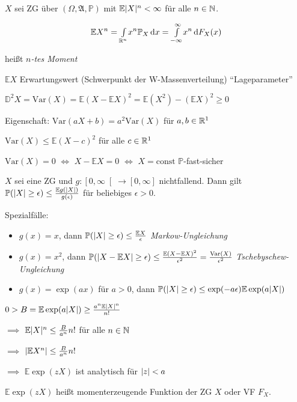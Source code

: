 \documentclass{cheat-sheet}
\newcommand{\Alg}{\mathfrak{A}} %
\renewcommand{\P}{\mathbb{P}} %
\newcommand{\E}{\mathbb{E}} %
\newcommand{\Var}{\mathrm{Var}} %
\begin{document}


$X$ sei ZG über $(\Omega, \Alg, \P)$ mit $\E \abs{X}^n < \infty$ für alle $n \in \mathbb{N}$.

\[ \E X^n = \Int{\R^n}{}{x^n \P_X}{x} = \Int{-\infty}{\infty}{x^n}{F_X(x)} \]

heißt \emph{$n$-tes Moment}

$\E X$ Erwartungswert (Schwerpunkt der W-Massenverteilung) "`Lageparameter"'

$\mathbb{D}^2 X = \Var(X) = \E(X-\E X)^2 = \E(X^2) - (\E X)^2 \geq 0$

Eigenschaft: $\Var(aX+b) = a^2 \Var(X)$ für $a, b \in \mathbb{R}^1$

$\Var(X) \leq \E (X-c)^2$ für alle $c \in \mathbb{R}^1$

$\Var(X) = 0$ $\iff$ $X - \E X = 0$ $\iff$ $X = \mathrm{const}$ $\P$-fast-sicher

\begin{satz}
  $X$ sei eine ZG und $g : \left[ 0, \infty \right[ \to [0,\infty]$ nichtfallend. Dann gilt $\P(\abs{X} \geq \epsilon) \leq \frac{\E g(\abs{X})}{g(\epsilon)}$ für beliebiges $\epsilon > 0$.
\end{satz}

Spezialfälle:

\begin{itemize}
  \item $g(x) = x$, dann $\P(\abs{X} \geq \epsilon) \leq \frac{\E X}{\epsilon}$ \emph{Markow-Ungleichung}
  \item $g(x) = x^2$, dann $\P(\abs{X - \E X} \geq \epsilon) \leq \frac{\E (X - \E X)^2}{\epsilon^2} = \frac{\Var(X)}{\epsilon^2}$ \emph{Tschebyschew-Ungleichung}
  \item $g(x) = \exp(ax)$ für $a > 0$, dann $\P(\abs{X} \geq \epsilon) \leq \exp(-a\epsilon) \E \exp(a \abs{X})$
\end{itemize}

$0 > B = \E \exp(a \abs{X}) \geq \frac{a^n \E \abs{X}^n}{n!}$

$\implies$ $\E \abs{X}^n \leq \tfrac{B}{a^n} n!$ für alle $n \in \mathbb{N}$

$\implies$ $\abs{\E X^n} \leq \tfrac{B}{a^n} n!$

$\implies$ $\E \exp(z X)$ ist analytisch für $\lvert z\rvert < a$

\begin{defn}
  $\E \exp(z X)$ heißt momenterzeugende Funktion der ZG $X$ oder VF $F_X$.
\end{defn}
\end{document}
